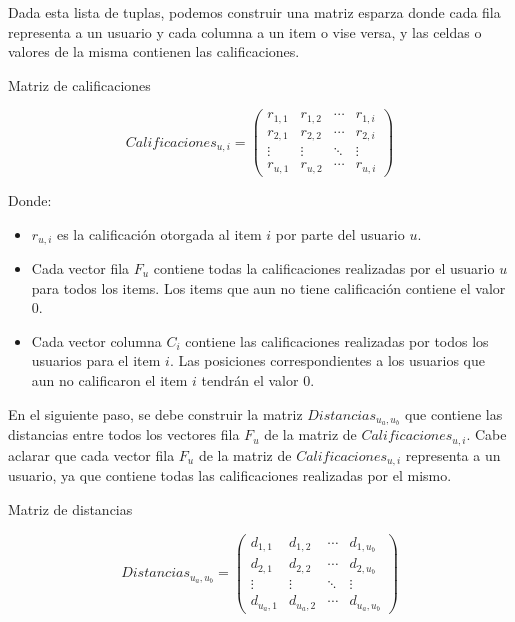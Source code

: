 \documentclass[11pt,a4paper,twoside]{thesis}
\begin{document}
Dada esta lista de tuplas, podemos construir una matriz esparza donde cada fila
representa a un usuario y cada columna a un item o vise versa, y las celdas o
valores de la misma contienen las calificaciones.

\begin{description}
	\item[Matriz de calificaciones]
\end{description}
\begin{equation}
	Calificaciones_{u,i} =
	\begin{pmatrix}
		r_{1,1} & r_{1,2} & \cdots & r_{1,i} \\
		r_{2,1} & r_{2,2} & \cdots & r_{2,i} \\
		\vdots  & \vdots  & \ddots & \vdots  \\
		r_{u,1} & r_{u,2} & \cdots & r_{u,i}
	\end{pmatrix}
\end{equation}

\begin{description}
	\item[Donde:]
\end{description}
\begin{itemize}
	\item $r_{u,i}$ es la calificación otorgada al item $i$ por parte del usuario $u$.
	\item Cada vector fila $F_u$ contiene todas la calificaciones realizadas por el
	      usuario $u$ para todos los items. Los items que aun no tiene calificación
	      contiene el valor $0$.
	\item Cada vector columna $C_i$ contiene las calificaciones realizadas por todos los
	      usuarios para el item $i$. Las posiciones correspondientes a los usuarios que
	      aun no calificaron el item $i$ tendrán el valor $0$.
\end{itemize}

En el siguiente paso, se debe construir la matriz $Distancias_{u_a,u_b}$ que
contiene las distancias entre todos los vectores fila $F_u$ de la matriz de
$Calificaciones_{u,i}$. Cabe aclarar que cada vector fila $F_u$ de la matriz de
$Calificaciones_{u,i}$ representa a un usuario, ya que contiene todas las
calificaciones realizadas por el mismo.

\clearpage
\begin{description}
	\item[Matriz de distancias]
\end{description}
\begin{equation}
	Distancias_{u_a,u_b} =
	\begin{pmatrix}
		d_{1,1}   & d_{1,2}   & \cdots & d_{1,u_b}   \\
		d_{2,1}   & d_{2,2}   & \cdots & d_{2,u_b}   \\
		\vdots    & \vdots    & \ddots & \vdots      \\
		d_{u_a,1} & d_{u_a,2} & \cdots & d_{u_a,u_b}
	\end{pmatrix}
\end{equation}
\end{document}
